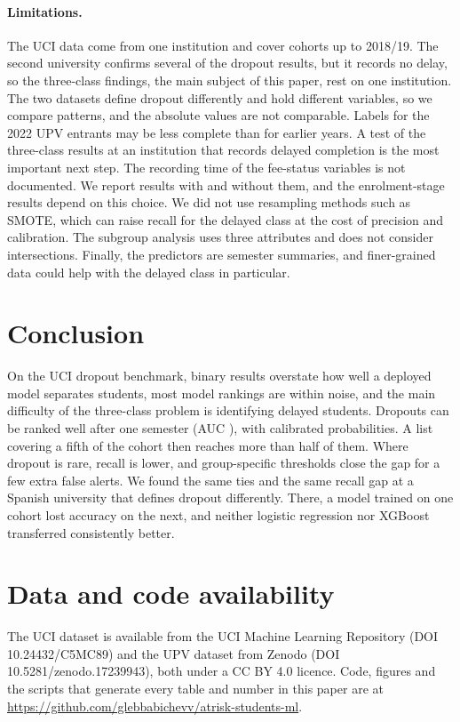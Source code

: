 \documentclass[11pt,a4paper]{article}
\begin{document}
\paragraph{Limitations.} The UCI data come from one institution and cover cohorts up to 2018/19. The second university confirms several of the dropout results, but it records no delay, so the three-class findings, the main subject of this paper, rest on one institution. The two datasets define dropout differently and hold different variables, so we compare patterns, and the absolute values are not comparable. Labels for the 2022 UPV entrants may be less complete than for earlier years. A test of the three-class results at an institution that records delayed completion is the most important next step. The recording time of the fee-status variables is not documented. We report results with and without them, and the enrolment-stage results depend on this choice. We did not use resampling methods such as SMOTE, which can raise recall for the delayed class at the cost of precision and calibration. The subgroup analysis uses three attributes and does not consider intersections. Finally, the predictors are semester summaries, and finer-grained data could help with the delayed class in particular.

\section{Conclusion}
\label{sec:conclusion}

On the UCI dropout benchmark, binary results overstate how well a deployed model separates students, most model rankings are within noise, and the main difficulty of the three-class problem is identifying delayed students. Dropouts can be ranked well after one semester (AUC \stageSemoneAucDrop), with calibrated probabilities. A list covering a fifth of the cohort then reaches more than half of them. Where dropout is rare, recall is lower, and group-specific thresholds close the gap for a few extra false alerts. We found the same ties and the same recall gap at a Spanish university that defines dropout differently. There, a model trained on one cohort lost accuracy on the next, and neither logistic regression nor XGBoost transferred consistently better.

\FloatBarrier
\section*{Data and code availability}
The UCI dataset is available from the UCI Machine Learning Repository (DOI 10.24432/C5MC89) and the UPV dataset from Zenodo (DOI 10.5281/zenodo.17239943), both under a CC BY 4.0 licence. Code, figures and the scripts that generate every table and number in this paper are at \url{https://github.com/glebbabichevv/atrisk-students-ml}.
\end{document}
